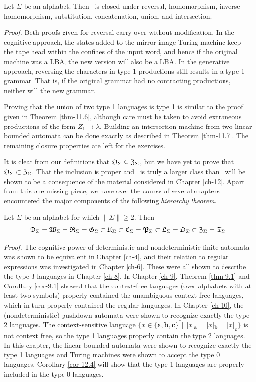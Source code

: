 \begin{thm}\label{thm-11.9}
Let $\Sigma$ be an alphabet. Then \OSIG\ is closed under reversal, homomorphism,
inverse homomorphism, substitution, concatenation, union, and intersection.

\emph{Proof.} Both proofs given for reversal carry over without modification. In
the cognitive approach, the states added to the mirror image Turing machine keep
the tape head within the confines of the input word, and hence if the original
machine was a LBA, the new version will also be a LBA. In the generative
approach, reversing the characters in type 1 productions still results in a type
1 grammar. That is, if the original grammar had no contracting productions,
neither will the new grammar.

Proving that the union of two type 1 languages is type 1 is similar to the
proof given in Theorem \ref{thm-11.6}, although care must be taken to avoid extraneous
productions of the form $Z_1\rightarrow\lambda$. Building an intersection
machine from two linear bounded automata can be done exactly as described in
Theorem \ref{thm-11.7}. The remaining closure properties are left for the exercises.
\end{thm}

It is clear from our definitions that $\mathfrak{O}_\Sigma\subseteq\mathfrak{Z}_\Sigma$, but we have yet to
prove that $\mathfrak{O}_\Sigma\subset\mathfrak{Z}_\Sigma$. That the inclusion is proper and \ZSIG\ is truly
a larger class than \OSIG\ will be shown to be a consequence of the material
considered in Chapter \ref{ch-12}. Apart from this one missing piece, we have over the
course of several chapters encountered the major components of the following
\emph{hierarchy theorem}.

\begin{thm}\label{thm-11.10}
Let $\Sigma$ be an alphabet for which $\|\Sigma\|\geq 2$. Then
\[ \mathfrak{D}_\Sigma=\mathfrak{W}_\Sigma=\mathfrak{R}_\Sigma=\mathfrak{G}_\Sigma\subset\mathfrak{U}_\Sigma\subset\mathfrak{C}_\Sigma=\mathfrak{P}_\Sigma\subset\mathfrak{L}_\Sigma=\mathfrak{O}_\Sigma
	\subset\mathfrak{Z}_\Sigma=\mathfrak{T}_\Sigma \]

\emph{Proof.} The cognitive power of deterministic and nondeterministic finite
automata was shown to be equivalent in Chapter \ref{ch-4}, and their relation to regular
expressions was investigated in Chapter \ref{ch-6}. These were all shown to describe the
type 3 languages in Chapter \ref{ch-8}. In Chapter \ref{ch-9}, Theorem \ref{thm-9.1} and Corollary \ref{cor-9.1}
showed that the context-free languages (over alphabets with at least two
symbols) properly contained the unambiguous context-free languages, which in
turn properly contained the regular languages. In Chapter \ref{ch-10}, the
(nondeterministic) pushdown automata were shown to recognize exactly the type 2
languages. The context-sensitive language $\{x\in\{\pmb{a},\pmb{b},\pmb{c}\}^*|\ 
\ |x|_{\pmb{a}}=|x|_{\pmb{b}}=|x|_{\pmb{c}}\}$ is not context free, so the type
1 languages properly contain the type 2 languages. In this chapter, the linear
bounded automata were shown to recognize exactly the type 1 languages and
Turing machines were shown to accept the type 0 languages. Corollary \ref{cor-12.4} will
show that the type 1 languages are properly included in the type 0 languages.
\end{thm}

